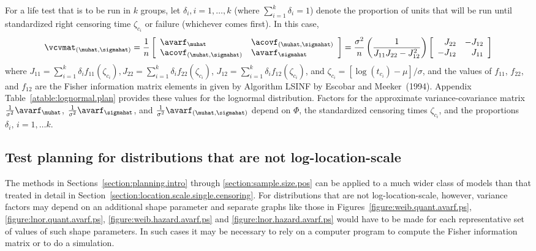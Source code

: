 For a life test that is to be run in $k$ groups, let $\delta_{i},
i=1, \ldots,k$ (where $\sum_{i=1}^{k}\delta_{i}=1$) denote the
proportion of units that will be run until standardized right
censoring time $\zeta_{c_{i}}$ or failure (whichever comes first).
In this case,
\begin{equation}
\label{equation:lsvcv}
\vcvmat_{(\muhat,\sigmahat)}=
\frac{1}{n}
\left [
 \begin{array}{ll}
  \avarf_{\muhat} &  \acovf_{(\muhat, \sigmahat)} \\
  \acovf_{(\muhat, \sigmahat)} &  \avarf_{\sigmahat}
 \end{array}
\right ]  = \frac{\sigma^{2}}{n}\left (
 \frac{1}{J_{11}J_{22}-J_{12}^{2}} \right )
\left [
 \begin{array}{rr}
  J_{22}  &  -J_{12} \\
  -J_{12}  &  J_{11} 
 \end{array}
\right ]
\end{equation}
where $J_{11}=\sum_{i=1}^{k}\delta_{i}f_{11}(\zeta_{c_{i}}),
J_{22}=\sum_{i=1}^{k}\delta_{i}f_{22}(\zeta_{c_{i}})$,
$J_{12}=\sum_{i=1}^{k}\delta_{i}f_{12}(\zeta_{c_{i}})$, and
$\zeta_{c_{i}} = [\log(t_{c_{i}})-\mu]/\sigma$, and the values of
$f_{11}$, $f_{22}$, and $f_{12}$ are the Fisher information matrix
elements in given by Algorithm LSINF by Escobar and Meeker~(1994).
Appendix Table~\ref{atable:lognormal.plan} provides these values for
the lognormal distribution.  Factors for the approximate
variance-covariance matrix $\frac{1}{\sigma^2}\avarf_{\muhat}$,
$\frac{1}{\sigma^2}\avarf_{\sigmahat}$, and
$\frac{1}{\sigma^2}\avarf_{(\muhat,\sigmahat)}$ depend on $\Phi$,
the standardized censoring times $\zeta_{c_{i}}$, and the
proportions $\delta_{i}, \,i=1,\ldots k$.

\subsection{Test planning for distributions that are not log-location-scale}
The methods in Sections~\ref{section:planning.intro} through
\ref{section:sample.size.pos} can be applied to a much
wider class of models than that treated in detail in
Section~\ref{section:location.scale.single.censoring}.  For
distributions that are not log-location-scale, however, variance
factors may depend on an additional shape parameter and separate
graphs like those in Figures~\ref{figure:weib.quant.avarf.ps},
\ref{figure:lnor.quant.avarf.ps}, \ref{figure:weib.hazard.avarf.ps}
and
\ref{figure:lnor.hazard.avarf.ps} would have to be made for each
representative set of values of such shape parameters.  In such
cases it may be necessary to rely on a computer program to compute
the Fisher information matrix or to do a simulation.

